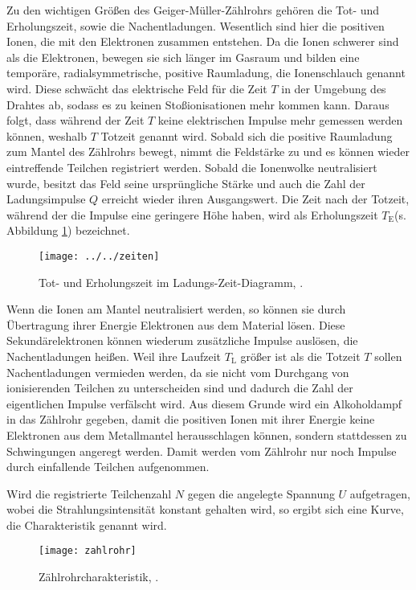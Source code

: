 \newpage
Zu den wichtigen Größen des Geiger-Müller-Zählrohrs gehören die Tot- und Erholungszeit, sowie die Nachentladungen. Wesentlich sind hier die positiven Ionen, die mit den Elektronen zusammen entstehen. Da die Ionen schwerer sind als die Elektronen, bewegen 
sie sich länger im Gasraum und bilden eine temporäre, radialsymmetrische, positive Raumladung, die Ionenschlauch genannt wird. Diese schwächt das elektrische Feld für die Zeit $T$ in der Umgebung des Drahtes ab, sodass es zu keinen Stoßionisationen mehr kommen 
kann.  Daraus folgt, dass während der Zeit $T$ keine elektrischen Impulse mehr gemessen werden können, weshalb $T$ Totzeit genannt wird. Sobald sich die positive Raumladung zum Mantel des Zählrohrs bewegt, nimmt die Feldstärke zu und es können wieder 
eintreffende Teilchen registriert werden. Sobald die Ionenwolke neutralisiert wurde, besitzt das Feld seine ursprüngliche Stärke und auch die Zahl der Ladungsimpulse $Q$ erreicht wieder ihren Ausgangswert. Die Zeit nach der Totzeit, während der die Impulse eine 
geringere Höhe haben, wird als Erholungszeit $T_{\text{E}}$(s. Abbildung \ref{fig:zeiten}) bezeichnet.

\begin{figure}[h!tbp]
	\centering
	\texttt{[image: ../../zeiten]}
	\caption{Tot- und Erholungszeit im Ladungs-Zeit-Diagramm, \cite[3]{anleitung703}.}
	\label{fig:zeiten}
\end{figure}

Wenn die Ionen am Mantel neutralisiert werden, so können sie durch Übertragung ihrer Energie Elektronen aus dem Material lösen. Diese Sekundärelektronen können wiederum zusätzliche Impulse auslösen, die Nachentladungen heißen. Weil ihre Laufzeit $T_{\text{L}}$
größer ist als die Totzeit $T$ sollen Nachentladungen vermieden werden, da sie nicht vom Durchgang von ionisierenden Teilchen zu unterscheiden sind und dadurch die Zahl der eigentlichen Impulse verfälscht wird. Aus diesem Grunde wird ein Alkoholdampf in das
Zählrohr gegeben, damit die positiven Ionen mit ihrer Energie keine Elektronen aus dem Metallmantel herausschlagen können, sondern stattdessen zu Schwingungen angeregt werden. Damit werden vom Zählrohr nur noch Impulse durch einfallende Teilchen aufgenommen.

Wird die registrierte Teilchenzahl $N$ gegen die angelegte Spannung $U$ aufgetragen, wobei die Strahlungsintensität konstant gehalten wird, so ergibt sich eine Kurve, die Charakteristik genannt wird.

\begin{figure}[h!tbp]
	\centering
	\texttt{[image: zahlrohr]}
	\caption{Zählrohrcharakteristik, \cite[5]{anleitung703}.}
	\label{fig:zahlrohr}
\end{figure}


